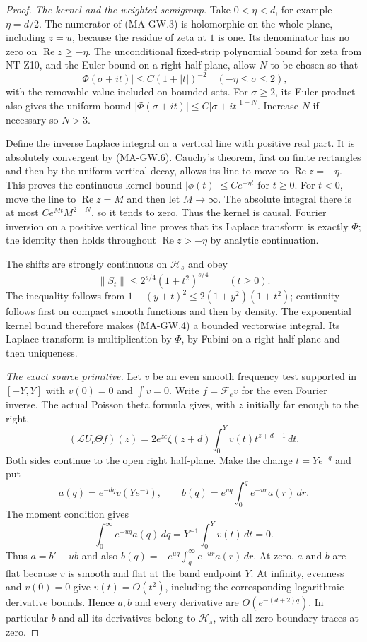 \begin{proof}
\emph{The kernel and the weighted semigroup.}
Take $0<\eta<d$, for example $\eta=d/2$.
The numerator of (MA-GW.3) is holomorphic on the whole plane,
including $z=u$, because the residue of zeta at $1$ is one.
Its denominator has no zero on $\operatorname{Re}z\ge-\eta$.
The unconditional fixed-strip polynomial bound for zeta
from NT-Z10, and the Euler bound on a right half-plane,
allow $N$ to be chosen so that
\[
 |\Phi(\sigma+it)|\le C(1+|t|)^{-2}
                       \quad(-\eta\le\sigma\le2),
 \tag{MA-GW.6}
\]
with the removable value included on bounded sets.
For $\sigma\ge2$, its Euler product also gives the uniform
bound $|\Phi(\sigma+it)|\le C|\sigma+it|^{1-N}$.
Increase $N$ if necessary so $N>3$.

Define the inverse Laplace integral on a vertical line with
positive real part.  It is absolutely convergent by
(MA-GW.6).  Cauchy's theorem, first on finite rectangles
and then by the uniform vertical decay, allows its line
to move to $\operatorname{Re}z=-\eta$.
This proves the continuous-kernel bound
$|\phi(t)|\le C e^{-\eta t}$ for $t\ge0$.
For $t<0$, move the line to $\operatorname{Re}z=M$ and
then let $M\to\infty$.
The absolute integral there is at most
$C e^{Mt}M^{2-N}$, so it tends to zero.
Thus the kernel is causal.  Fourier inversion on a
positive vertical line proves that its Laplace transform
is exactly $\Phi$; the identity then holds throughout
$\operatorname{Re}z>-\eta$ by analytic continuation.

The shifts are strongly continuous on $\mathcal H_s$ and obey
\[
 \|S_t\|\le2^{s/4}(1+t^2)^{s/4}\qquad(t\ge0).
 \tag{MA-GW.7}
\]
The inequality follows from
$1+(y+t)^2\le2(1+y^2)(1+t^2)$; continuity follows first
on compact smooth functions and then by density.
The exponential kernel bound therefore makes (MA-GW.4)
a bounded vectorwise integral.  Its Laplace transform
is multiplication by $\Phi$, by Fubini on a right
half-plane and then uniqueness.

\emph{The exact source primitive.}
Let $v$ be an even smooth frequency test supported in
$[-Y,Y]$ with $v(0)=0$ and $\int v=0$.
Write $f=\mathcal F_e v$ for the even Fourier inverse.
The actual Poisson theta formula gives, with
$z$ initially far enough to the right,
\[
 (\mathcal L U_c\Theta f)(z)
       =2e^{zc}\zeta(z+d)
                        \int_0^Yv(t)t^{z+d-1}\,dt .
 \tag{MA-GW.8}
\]
Both sides continue to the open right half-plane.
Make the change $t=Y e^{-q}$ and put
\[
 a(q)=e^{-dq}v(Y e^{-q}),\qquad
 b(q)=e^{uq}\int_0^q e^{-ur}a(r)\,dr.
 \tag{MA-GW.9}
\]
The moment condition gives
\[
       \int_0^\infty e^{-uq}a(q)\,dq
                         =Y^{-1}\int_0^Yv(t)\,dt=0.
 \tag{MA-GW.10}
\]
Thus $a=b'-ub$ and also
$b(q)=-e^{uq}\int_q^\infty e^{-ur}a(r)\,dr$.
At zero, $a$ and $b$ are flat because $v$ is smooth and
flat at the band endpoint $Y$.
At infinity, evenness and $v(0)=0$ give
$v(t)=O(t^2)$, including the corresponding logarithmic
derivative bounds.  Hence $a,b$ and every derivative
are $O(e^{-(d+2)q})$.
In particular $b$ and all its derivatives belong to
$\mathcal H_s$, with all zero boundary traces at zero.


\end{proof}
